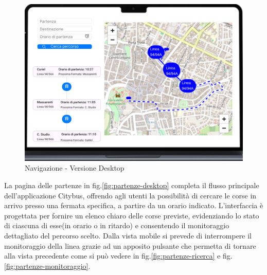 \begin{figure}[H]
  \centering
  \includegraphics[width=\textwidth]{images/mockup/Navigazione Desktop.png}
  \caption{Navigazione - Versione Desktop}
  \label{fig:navigazione-desktop}
\end{figure}

La pagina delle partenze in fig.\ref{fig:partenze-desktop} completa il flusso principale dell’applicazione Citybus, offrendo agli utenti la possibilità di cercare le corse in arrivo presso una fermata specifica, a partire da un orario indicato. L’interfaccia è progettata per fornire un elenco chiaro delle corse previste, evidenziando lo stato di ciascuna di esse(in orario o in ritardo) e consentendo il monitoraggio dettagliato del percorso scelto.
Dalla vista mobile si prevede di interrompere il monitoraggio della linea grazie ad un apposito pulsante che permetta di tornare alla vista precedente come si può vedere in fig.\ref{fig:partenze-ricerca} e fig.\ref{fig:partenze-monitoraggio}.

